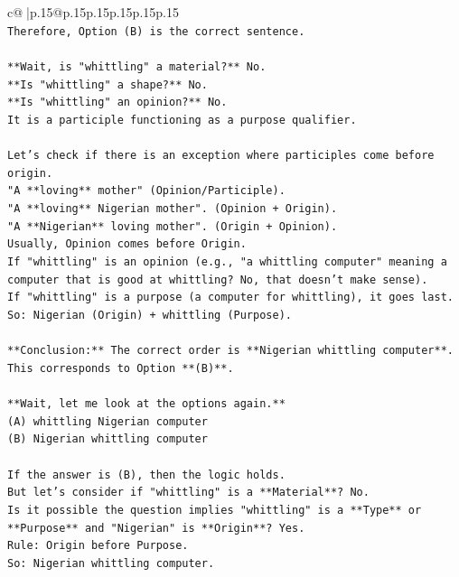 \documentclass{article}
\begin{document}
{\begin{supertabular}{c@{$\;$}|p{.15\linewidth}@{}p{.15\linewidth}p{.15\linewidth}p{.15\linewidth}p{.15\linewidth}p{.15\linewidth}}
{{{\\ 
\texttt{Therefore, Option (B) is the correct sentence.} \\
\\ 
\texttt{**Wait, is "whittling" a material?** No.} \\
\texttt{**Is "whittling" a shape?** No.} \\
\texttt{**Is "whittling" an opinion?** No.} \\
\texttt{It is a participle functioning as a purpose qualifier.} \\
\\ 
\texttt{Let's check if there is an exception where participles come before origin.} \\
\texttt{"A **loving** mother" (Opinion/Participle).} \\
\texttt{"A **loving** Nigerian mother". (Opinion + Origin).} \\
\texttt{"A **Nigerian** loving mother". (Origin + Opinion).} \\
\texttt{Usually, Opinion comes before Origin.} \\
\texttt{If "whittling" is an opinion (e.g., "a whittling computer" meaning a computer that is good at whittling? No, that doesn't make sense).} \\
\texttt{If "whittling" is a purpose (a computer for whittling), it goes last.} \\
\texttt{So: Nigerian (Origin) + whittling (Purpose).} \\
\\ 
\texttt{**Conclusion:** The correct order is **Nigerian whittling computer**.} \\
\texttt{This corresponds to Option **(B)**.} \\
\\ 
\texttt{**Wait, let me look at the options again.**} \\
\texttt{(A) whittling Nigerian computer} \\
\texttt{(B) Nigerian whittling computer} \\
\\ 
\texttt{If the answer is (B), then the logic holds.} \\
\texttt{But let's consider if "whittling" is a **Material**? No.} \\
\texttt{Is it possible the question implies "whittling" is a **Type** or **Purpose** and "Nigerian" is **Origin**? Yes.} \\
\texttt{Rule: Origin before Purpose.} \\
\texttt{So: Nigerian whittling computer.} \\
}}}
\end{supertabular}}
\end{document}
